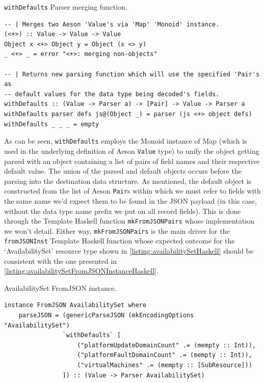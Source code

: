 \documentclass[11pt]{report}
\begin{document}
\begin{listing}[H]
\caption{\texttt{withDefaults} Parser merging function.}
\label{listing:withDefaultsHaskell}
\begin{verbatim}
-- | Merges two Aeson 'Value's via 'Map' 'Monoid' instance.
(<+>) :: Value -> Value -> Value
Object x <+> Object y = Object (x <> y)
_ <+> _ = error "<+>: merging non-objects"

-- | Returns new parsing function which will use the specified 'Pair's as
-- default values for the data type being decoded's fields.
withDefaults :: (Value -> Parser a) -> [Pair] -> Value -> Parser a
withDefaults parser defs js@(Object _) = parser (js <+> object defs)
withDefaults _ _ _ = empty
\end{verbatim}
\end{listing}

As can be seen, \texttt{withDefaults} employs the Monoid instance of Map (which
is used in the underlying definition of Aeson \texttt{Value} type) to unify the
object getting parsed with an object containing a list of pairs of field names
and their respective default value. The union of the parsed and default objects
occurs before the parsing into the destination data structure.
As mentioned, the default object is constructed from the list of Aeson
\texttt{Pair}s within which we must refer to fields with the same
name we'd expect them to be found in the JSON payload (in
this case, without the data type name prefix we put on all record fields). This
is done through the Template Haskell function \texttt{mkFromJSONPairs} whose
implementation we won't detail. Either way, \texttt{mkFromJSONPairs} is the
main driver for the \texttt{fromJSONInst} Template Haskell function whose
expected outcome for the `AvailabilitySet' resource type shown in
\autoref{listing:availabilitySetHaskell} should be consistent with the one
presented in \autoref{listing:availabilitySetFromJSONInstanceHaskell}.

\begin{listing}[H]
\caption{AvailabilitySet FromJSON instance.}
\label{listing:availabilitySetFromJSONInstanceHaskell}
\begin{verbatim}
instance FromJSON AvailabilitySet where
    parseJSON = (genericParseJSON (mkEncodingOptions "AvailabilitySet")
                `withDefaults` [
                    ("platformUpdateDomainCount" .= (mempty :: Int)),
                    ("platformFaultDomainCount" .= (mempty :: Int)),
                    ("virtualMachines" .= (mempty :: [SubResource]))
                ]) :: (Value -> Parser AvailabilitySet)
\end{verbatim}
\end{listing}
\end{document}
